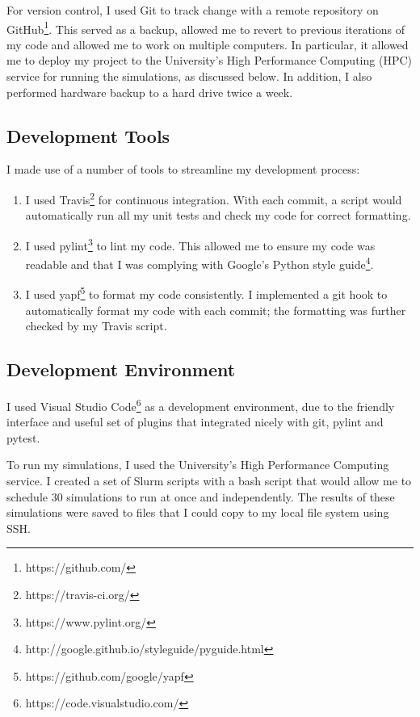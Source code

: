 \documentclass[12pt,a4paper,twoside,openright]{report}
\begin{document}
For version control, I used Git to track change with a remote repository on GitHub\footnote{https://github.com/}. This served as a backup, allowed me to revert to previous iterations of my code and allowed me to work on multiple computers. In particular, it allowed me to deploy my project to the University's High Performance Computing (HPC) service for running the simulations, as discussed below. In addition, I also performed hardware backup to a hard drive twice a week.

\subsection{Development Tools}

I made use of a number of tools to streamline my development process:

\begin{enumerate}
	\item I used Travis\footnote{https://travis-ci.org/} for continuous integration. With each commit, a script would automatically run all my unit tests and check my code for correct formatting.
	\item I used pylint\footnote{https://www.pylint.org/} to lint my code. This allowed me to ensure my code was readable and that I was complying with Google's Python style guide\footnote{http://google.github.io/styleguide/pyguide.html}.
	\item I used yapf\footnote{https://github.com/google/yapf} to format my code consistently. I implemented a git hook to automatically format my code with each commit; the formatting was further checked by my Travis script.
\end{enumerate}

\subsection{Development Environment}

I used Visual Studio Code\footnote{https://code.visualstudio.com/} as a development environment, due to the friendly interface and useful set of plugins that integrated nicely with git, pylint and pytest. 

To run my simulations, I used the University's High Performance Computing service. I created a set of Slurm scripts with a bash script that would allow me to schedule 30 simulations to run at once and independently. The results of these simulations were saved to files that I could copy to my local file system using SSH.
\end{document}
